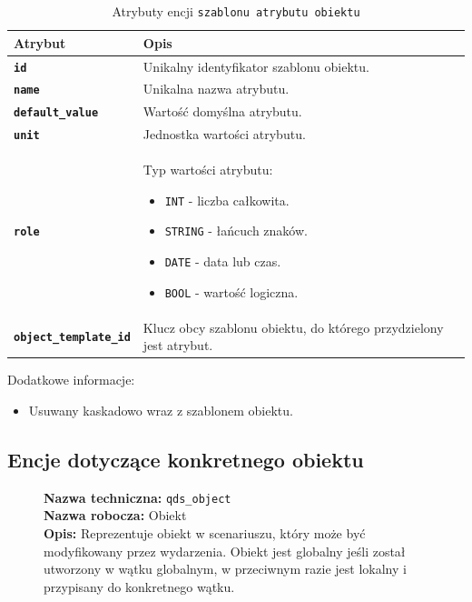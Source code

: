 \begin{table}[H]
    \centering
    \renewcommand{\arraystretch}{1.6}
    \begin{tabular}{|>{\bfseries}l|p{}|}
        \hline
        \rowcolor[HTML]{EFEFEF} \textbf{Atrybut} & \textbf{Opis} \\
        \hline
        \texttt{id} & Unikalny identyfikator szablonu obiektu. \\
        \hline
        \texttt{name} & Unikalna nazwa atrybutu. \\
        \hline
        \texttt{default\_value} & Wartość domyślna atrybutu. \\
        \hline
        \texttt{unit} & Jednostka wartości atrybutu. \\
        \hline
        \texttt{role} & Typ wartości atrybutu:
        \begin{itemize}
            \item \texttt{INT} - liczba całkowita.
            \item \texttt{STRING} - łańcuch znaków.
            \item \texttt{DATE} - data lub czas.
            \item \texttt{BOOL} - wartość logiczna.
        \end{itemize} \\
        \hline
        \texttt{object\_template\_id} & Klucz obcy szablonu obiektu, do którego przydzielony jest atrybut. \\
        \hline
    \end{tabular}
    \caption{Atrybuty encji \texttt{szablonu atrybutu obiektu}}
\end{table}

Dodatkowe informacje:
\begin{itemize}
    \item Usuwany kaskadowo wraz z szablonem obiektu.
\end{itemize}

\subsection{Encje dotyczące konkretnego obiektu}

\begin{figure}[H]
    \centering
    \begin{minipage}{0.8\textwidth}
        \begin{framed}
            \noindent\textbf{\large Nazwa techniczna:} \texttt{qds\_object} \\
            \textbf{\large Nazwa robocza:} Obiekt \\
            \textbf{\large Opis:} Reprezentuje obiekt w scenariuszu, który może być modyfikowany przez wydarzenia.
            Obiekt jest globalny jeśli został utworzony w wątku globalnym, w przeciwnym razie jest lokalny
            i przypisany do konkretnego wątku.
        \end{framed}
    \end{minipage}
\end{figure}

